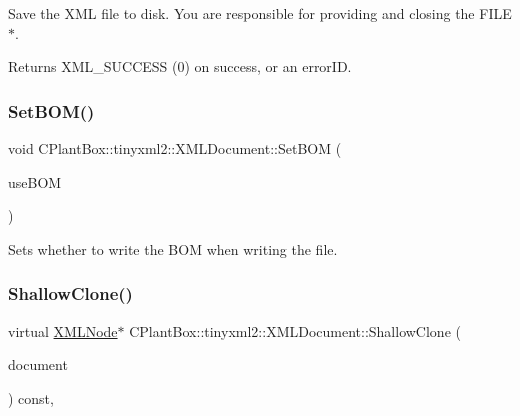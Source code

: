 Save the X\+ML file to disk. You are responsible for providing and closing the F\+I\+L\+E$\ast$.

Returns X\+M\+L\+\_\+\+S\+U\+C\+C\+E\+SS (0) on success, or an error\+ID. \mbox{\label{classCPlantBox_1_1tinyxml2_1_1XMLDocument_ac906b99f5fc6405204391316c0c0f709}} 
\subsubsection{\texorpdfstring{Set\+B\+O\+M()}{SetBOM()}}
{\footnotesize\ttfamily void C\+Plant\+Box\+::tinyxml2\+::\+X\+M\+L\+Document\+::\+Set\+B\+OM (\begin{DoxyParamCaption}\item[{bool}]{use\+B\+OM }\end{DoxyParamCaption})\hspace{0.3cm}{\ttfamily [inline]}}

Sets whether to write the B\+OM when writing the file. \mbox{\label{classCPlantBox_1_1tinyxml2_1_1XMLDocument_a5de1843a6497c0ec45a36022ab22fc77}} 
\subsubsection{\texorpdfstring{Shallow\+Clone()}{ShallowClone()}}
{\footnotesize\ttfamily virtual \hyperlink{classCPlantBox_1_1tinyxml2_1_1XMLNode}{X\+M\+L\+Node}$\ast$ C\+Plant\+Box\+::tinyxml2\+::\+X\+M\+L\+Document\+::\+Shallow\+Clone (\begin{DoxyParamCaption}\item[{\hyperlink{classCPlantBox_1_1tinyxml2_1_1XMLDocument}{X\+M\+L\+Document} $\ast$}]{document }\end{DoxyParamCaption}) const\hspace{0.3cm}{\ttfamily [inline]}, {\ttfamily [virtual]}}

